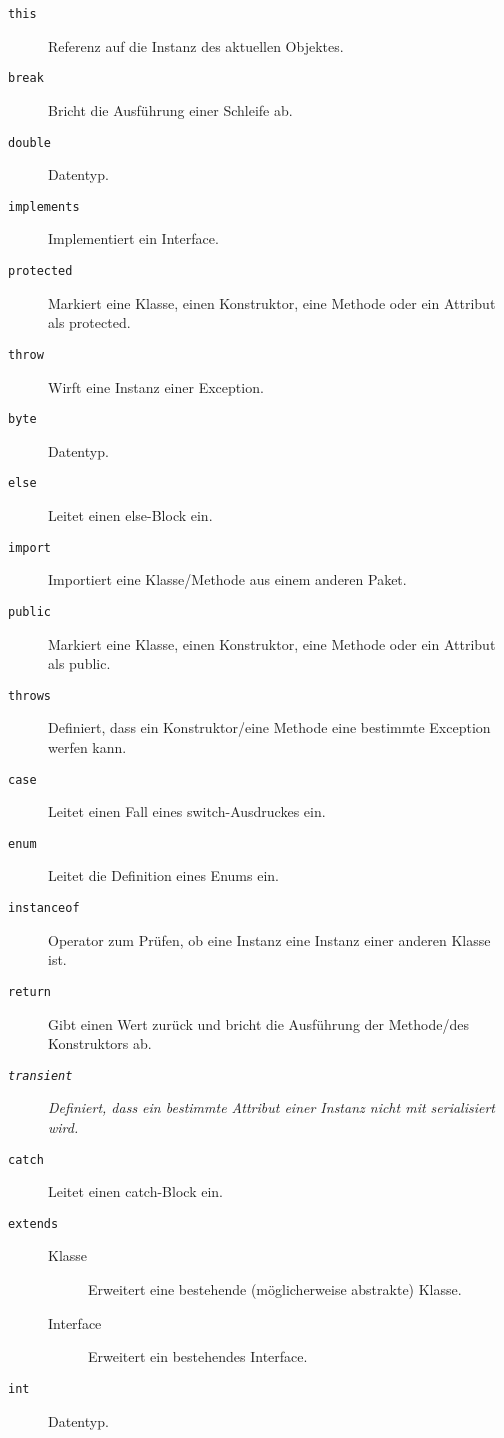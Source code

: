 \begin{description}
        \item[\texttt{this}] Referenz auf die Instanz des aktuellen Objektes.
        \item[\texttt{break}] Bricht die Ausführung einer Schleife ab.
        \item[\texttt{double}] Datentyp.
        \item[\texttt{implements}] Implementiert ein Interface.
        \item[\texttt{protected}] Markiert eine Klasse, einen Konstruktor, eine Methode oder ein Attribut als protected.
        \item[\texttt{throw}] Wirft eine Instanz einer Exception.
        \item[\texttt{byte}] Datentyp.
        \item[\texttt{else}] Leitet einen else-Block ein.
        \item[\texttt{import}] Importiert eine Klasse/Methode aus einem anderen Paket.
        \item[\texttt{public}]  Markiert eine Klasse, einen Konstruktor, eine Methode oder ein Attribut als public.
        \item[\texttt{throws}] Definiert, dass ein Konstruktor/eine Methode eine bestimmte Exception werfen kann.
        \item[\texttt{case}] Leitet einen Fall eines switch-Ausdruckes ein.
        \item[\texttt{enum}] Leitet die Definition eines Enums ein.
        \item[\texttt{instanceof}] Operator zum Prüfen, ob eine Instanz eine Instanz einer anderen Klasse ist.
        \item[\texttt{return}] Gibt einen Wert zurück und bricht die Ausführung der Methode/des Konstruktors ab.
        \item[\textit{\texttt{transient}}] \textit{Definiert, dass ein bestimmte Attribut einer Instanz nicht mit serialisiert wird.}
        \item[\texttt{catch}] Leitet einen catch-Block ein.
        \item[\texttt{extends}]
	        \begin{description}
	        	\item[Klasse] Erweitert eine bestehende (möglicherweise abstrakte) Klasse.
	        	\item[Interface] Erweitert ein bestehendes Interface.
	        \end{description}
        \item[\texttt{int}] Datentyp.

\end{description}
